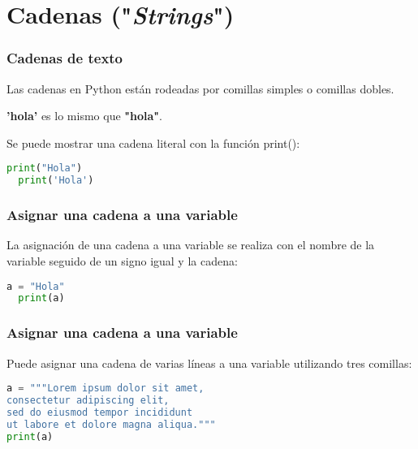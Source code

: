 
\section{Cadenas ("\emph{Strings}")}

\begin{frame}[fragile]
  \frametitle{Cadenas de texto}

  Las cadenas en Python están rodeadas por comillas simples o comillas dobles.

  \vspace{\baselineskip}
  \textbf{'hola'} es lo mismo que \textbf{"hola"}.

  \vspace{\baselineskip}
  Se puede mostrar una cadena literal con la función
  \textcolor{codeKeyword}{print}():

  \vspace{\baselineskip}
  \begin{lstlisting}[language=Python]
  print("Hola")
  print('Hola')
  \end{lstlisting}
\end{frame}

\begin{frame}[fragile]
  \frametitle{Asignar una cadena a una variable}

  La asignación de una cadena a una variable se realiza con el nombre de
  la variable seguido de un signo igual y la cadena:

  \vspace{\baselineskip}
  \begin{lstlisting}[language=Python]
  a = "Hola"
  print(a)
  \end{lstlisting}
\end{frame}

\begin{frame}[fragile]
  \frametitle{Asignar una cadena a una variable}

  Puede asignar una cadena de varias líneas a una variable
  utilizando tres comillas:

  \begin{lstlisting}[language=Python]
a = """Lorem ipsum dolor sit amet,
consectetur adipiscing elit,
sed do eiusmod tempor incididunt
ut labore et dolore magna aliqua."""
print(a) 
  \end{lstlisting}
\end{frame}

